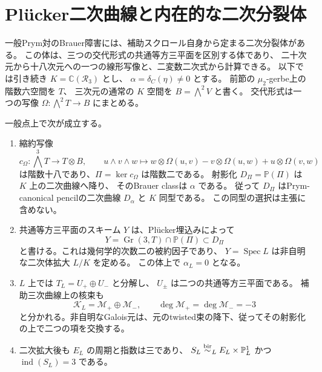 \section{Pl\"ucker二次曲線と内在的な二次分裂体}
\label{sec:intrinsic-quadratic-splitting-v28}

一般Prym対のBrauer障害には、補助スクロール自身から定まる二次分裂体がある。
この体は、三つの交代形式の共通等方三平面を区別する体であり、
二十次元から十八次元への一つの線形写像と、二変数二次式から計算できる。
以下では引き続き $K=\mathbb C(\mathcal R_3)$ とし、
$\alpha=\delta_C(\eta)\ne0$ とする。
前節の $\mu_2$-gerbe上の階数六空間を $T$、
三次元の通常の $K$ 空間を $B=\bigwedge^2V$ と書く。
交代形式は一つの写像 $\Omega:\bigwedge^2T\to B$ にまとめる。

\begin{theorem}[内在的な二次分裂体]
\label{thm:intrinsic-quadratic-splitting-v28}
一般点上で次が成立する。
\begin{enumerate}
\item 縮約写像
\[
 c_\Omega:\bigwedge^3T\longrightarrow T\otimes B,\qquad
 u\wedge v\wedge w\longmapsto
 w\otimes\Omega(u,v)-v\otimes\Omega(u,w)+u\otimes\Omega(v,w)
\]
は階数十八であり、$\Pi=\ker c_\Omega$ は階数二である。
射影化 $D_\Pi=\mathbb P(\Pi)$ は $K$ 上の二次曲線へ降り、
そのBrauer classは $\alpha$ である。
従って $D_\Pi$ はPrym-canonical pencilの二次曲線 $D_\alpha$ と $K$ 同型である。
この同型の選択は主張に含めない。
\item 共通等方三平面のスキーム $Y$ は、Pl\"ucker埋込みによって
\[
 Y=\operatorname{Gr}(3,T)\cap\mathbb P(\Pi)\subset D_\Pi
\]
と書ける。これは幾何学的次数二の被約因子であり、
$Y=\operatorname{Spec}L$ は非自明な二次体拡大 $L/K$ を定める。
この体上で $\alpha_L=0$ となる。
\item $L$ 上では $T_L=U_+\oplus U_-$ と分解し、
$U_\pm$ は二つの共通等方三平面である。
補助三次曲線上の核束も
\[
 \mathcal K_L=\mathcal M_+\oplus\mathcal M_-,\qquad
 \deg\mathcal M_+=\deg\mathcal M_-=-3
\]
と分かれる。非自明なGalois元は、元のtwisted束の降下、従ってその射影化の上で二つの項を交換する。
\item 二次拡大後も $E_L$ の周期と指数は三であり、
$S_L\mathrel{\overset{\mathrm{bir}}{\sim}}_L E_L\times\mathbb P^1_L$ かつ
$\operatorname{ind}(S_L)=3$ である。
\end{enumerate}
\end{theorem}

